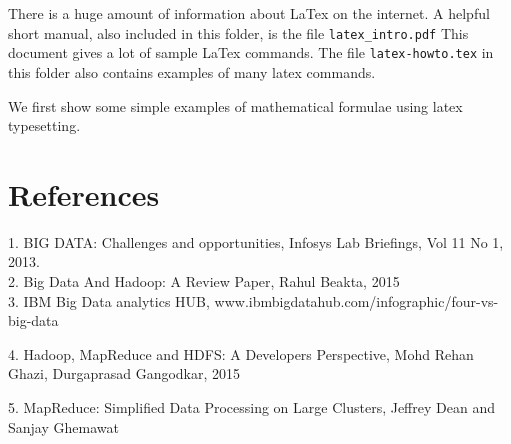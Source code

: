 \documentclass[11pt]{book}
\begin{document}
There is a huge amount of information about LaTex on the internet.
A helpful short manual, also included in this folder, is the file
\verb+latex_intro.pdf+
This document gives a lot of sample LaTex commands.  
The file \verb+latex-howto.tex+ in this folder also contains examples of many latex commands.




We first show  some simple examples of 
mathematical formulae using latex typesetting.





\section{References}
1. BIG DATA: Challenges and opportunities, Infosys Lab Briefings,
Vol 11 No 1, 2013. \\

2. Big Data And Hadoop: A Review Paper, Rahul Beakta, 2015 \\

 3. IBM Big Data analytics HUB,
www.ibmbigdatahub.com/infographic/four-vs-big-data

4. Hadoop, MapReduce and HDFS: A Developers Perspective, 
Mohd Rehan Ghazi, Durgaprasad Gangodkar, 2015

5. MapReduce: Simplified Data Processing on Large Clusters, 
Jeffrey Dean and Sanjay Ghemawat
\end{document}
